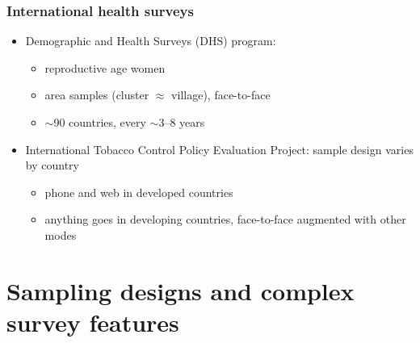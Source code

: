 \documentclass{beamer}
\begin{document}
\begin{frame}\frametitle{International health surveys}

\begin{itemize}
    \item Demographic and Health Surveys (DHS) program:
    \begin{itemize}
        \item reproductive age women
        \item area samples (cluster $\approx$ village), face-to-face
        \item $\sim$90 countries, every $\sim$3--8 years
    \end{itemize}
    \item International Tobacco Control Policy Evaluation Project: sample design varies by country
    \begin{itemize}
        \item phone and web in developed countries
        \item anything goes in developing countries, face-to-face augmented with other modes
    \end{itemize}
\end{itemize}

\end{frame}

\section{Sampling designs and complex survey features}
\end{document}
